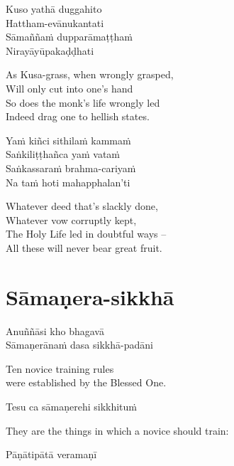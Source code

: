 Kuso yathā duggahito\\
Hattham-evānukantati\\
Sāmaññaṁ dupparāmaṭṭhaṁ\\
Nirayāyūpakaḍḍhati

\begin{english}
  As Kusa-grass, when wrongly grasped,\\
  Will only cut into one's hand\\
  So does the monk's life wrongly led\\
  Indeed drag one to hellish states.
\end{english}

Yaṁ kiñci sithilaṁ kammaṁ\\
Saṅkiliṭṭhañca yaṁ vataṁ\\
Saṅkassaraṁ brahma-cariyaṁ\\
Na taṁ hoti mahapphalan'ti

\ifreferenceedition
\clearpage
\fi

\begin{english}
  Whatever deed that's slackly done,\\
  Whatever vow corruptly kept,\\
  The Holy Life led in doubtful ways --\\
  All these will never bear great fruit. 
\end{english}

\ifhandbookedition
\clearpage
\fi

\section{Sāmaṇera-sikkhā}


Anuññāsi kho bhagavā\\
Sāmaṇerānaṁ dasa sikkhā-padāni

\begin{cprenglish}
  Ten novice training rules\\
  were established by the Blessed One.
\end{cprenglish}

Tesu ca sāmaṇerehi sikkhituṁ

\begin{cprenglish}
  They are the things in which a novice should train:
\end{cprenglish}

Pāṇātipātā veramaṇī


